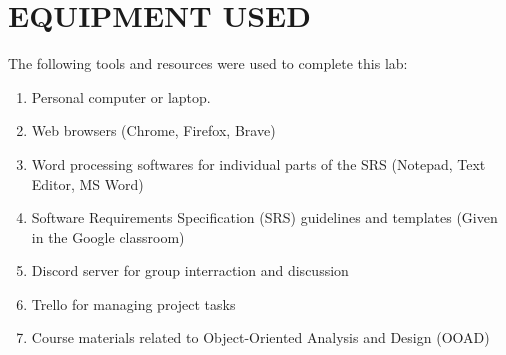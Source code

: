 \chapter{EQUIPMENT USED}
\label{ch:eqp_used}
The following tools and resources were used to complete this lab:
\begin{enumerate}
    \item Personal computer or laptop.
    \item Web browsers (Chrome, Firefox, Brave)
    \item Word processing softwares for individual parts of the SRS (Notepad, Text Editor, MS Word)
    \item Software Requirements Specification (SRS) guidelines and templates (Given in the Google classroom)
    \item Discord server for group interraction and discussion
    \item Trello for managing project tasks
    \item Course materials related to Object-Oriented Analysis and Design (OOAD)

\end{enumerate}
\clearpage






